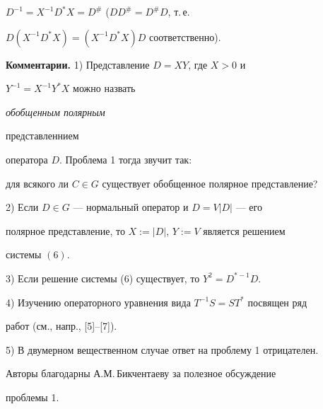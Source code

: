 $D^{-1}=X^{-1}D^{*}X=D^{\#}$ ($DD^{\#}=D^{\#}D$, т.\,е.


$D(X^{-1}D^{*}X)=(X^{-1}D^{*}X)D$ соответственно).


\medskip





{\bf Комментарии.} 1) Представление $D=XY$, где $X>0$ и


$Y^{-1}=X^{-1}Y^{*}X$ можно назвать {\it обобщенным полярным


представленнием } оператора $D$. Проблема 1 тогда звучит так:


для всякого ли $C\in G$ существует обобщенное полярное представление?





2) Если $D\in G$ --- нормальный оператор и $D=V\vert D\vert$ --- его


полярное представление, то $X:=\vert D\vert$, $Y:=V$ является решением


системы $(6)$.





3) Если решение системы (6) существует, то $Y^{2}=D^{*-1}D$.





4) Изучению операторного уравнения вида $T^{-1}S=ST^{*}$ посвящен ряд


работ (см., напр., [5]--[7]).





5) В двумерном вещественном случае ответ на проблему 1 отрицателен.





Авторы благодарны А.М.\,Бикчентаеву за полезное обсуждение


проблемы 1.





